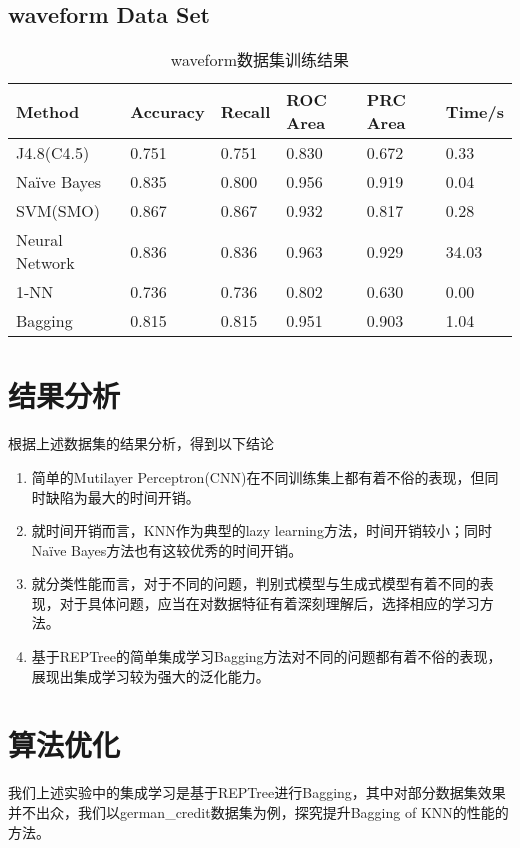 \documentclass[a4paper,UTF8]{article}
\numberwithin{equation}{section}
\begin{document}
\subsection{waveform Data Set}
\begin{table}[H]
\centering
\caption{waveform数据集训练结果}
\label{my-label}
\begin{tabular}{l|lllll}
\hline
Method         & Accuracy & Recall & ROC Area & PRC Area & Time/s \\ \hline
J4.8(C4.5)     & 0.751    & 0.751  & 0.830    & 0.672    & 0.33   \\ \hline
Naïve Bayes   & 0.835    & 0.800  & 0.956    & 0.919    & 0.04   \\ \hline
SVM(SMO)       & 0.867    & 0.867  & 0.932    & 0.817    & 0.28   \\ \hline
Neural Network & 0.836    & 0.836  & 0.963    & 0.929    & 34.03  \\ \hline
1-NN           & 0.736    & 0.736  & 0.802    & 0.630    & 0.00   \\ \hline
Bagging        & 0.815    & 0.815  & 0.951    & 0.903    & 1.04   \\ \hline
\end{tabular}
\end{table}

\section{结果分析}
根据上述数据集的结果分析，得到以下结论
\begin{enumerate}
\item 简单的Mutilayer Perceptron(CNN)在不同训练集上都有着不俗的表现，但同时缺陷为最大的时间开销。
\item 就时间开销而言，KNN作为典型的lazy learning方法，时间开销较小；同时Naïve Bayes方法也有这较优秀的时间开销。
\item 就分类性能而言，对于不同的问题，判别式模型与生成式模型有着不同的表现，对于具体问题，应当在对数据特征有着深刻理解后，选择相应的学习方法。
\item 基于REPTree的简单集成学习Bagging方法对不同的问题都有着不俗的表现，展现出集成学习较为强大的泛化能力。
\end{enumerate}

\section{算法优化}
我们上述实验中的集成学习是基于REPTree进行Bagging，其中对部分数据集效果并不出众，我们以german\_credit数据集为例，探究提升Bagging of KNN的性能的方法。
\end{document}
